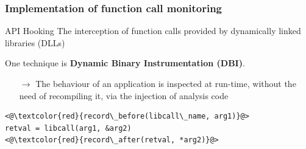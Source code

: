\documentclass[compress]{beamer}
\begin{document}
\begin{frame}[fragile]
    \frametitle{Implementation of function call monitoring}
	
	    \begin{beamerboxesrounded}[shadow=true]{API Hooking}
    The interception of function calls provided by dynamically
linked \\ libraries (DLLs)
    \end{beamerboxesrounded}
    \bigskip
	
	
    
    

One technique is \textbf{Dynamic Binary Instrumentation (DBI)}.
\begin{itemize}
\item[$\rightarrow$] The behaviour of an application is inspected at run-time, without the need of recompiling it, via the injection of analysis code
\end{itemize}
\smallskip

\begin{block}{}
\begin{lstlisting}[basicstyle=\ttfamily\large,xleftmargin=50pt]
<@\textcolor{red}{record\_before(libcall\_name, arg1)}@> 
retval = libcall(arg1, &arg2)
<@\textcolor{red}{record\_after(retval, *arg2)}@> 
\end{lstlisting}
\end{block}


\end{frame}
\end{document}
